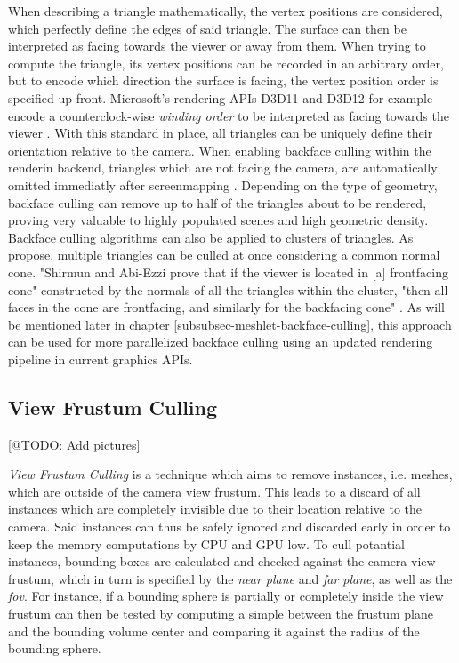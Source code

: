 \noindent
When describing a triangle mathematically, the vertex positions are considered, which perfectly define the edges of 
said triangle. The surface can then be interpreted as facing towards the viewer or away from them. 
When trying to compute the triangle, its vertex positions can be recorded in an arbitrary order, but to encode which 
direction the surface is facing, the vertex position order is specified up front. Microsoft's rendering \ac{API}s D3D11 
and D3D12 for example encode a counterclock-wise \emph{winding order} to be interpreted as facing towards the viewer 
\cite{D3DTopology2020}. With this standard in place, all triangles can be uniquely define their orientation relative 
to the camera. When enabling backface culling within the renderin backend, triangles which are not facing the camera, 
are automatically omitted immediatly after screenmapping \cite{AkenineMoeller2018}. Depending on the type of geometry, 
backface culling can remove up to half of the triangles about to be rendered, proving very valuable to highly populated 
scenes and high geometric density.\\

Backface culling algorithms can also be applied to clusters of triangles. As \cite{Shirmun1993} propose, multiple 
triangles can be culled at once considering a common normal cone. "Shirmun and Abi-Ezzi \cite{Shirmun1993} prove that 
if the viewer is located in [a] frontfacing cone" constructed by the normals of all the triangles within the cluster, 
"then all faces in the cone are frontfacing, and similarly for the backfacing cone" \cite{AkenineMoeller2018}. As 
will be mentioned later in chapter \ref{subsubsec-meshlet-backface-culling}, this approach can be used for more 
parallelized backface culling using an updated rendering pipeline in current graphics \ac{API}s.

\subsection{View Frustum Culling} \label{subsec-view-frustum-culling}

[@TODO: Add pictures]

\emph{View Frustum Culling} is a technique which aims to remove instances, i.e. meshes, which are outside of the camera 
view frustum. This leads to a discard of all instances which are completely invisible due to their location relative to 
the camera. Said instances can thus be safely ignored and discarded early in order to keep the memory computations by 
\ac{CPU} and \ac{GPU} low. To cull potantial instances, bounding boxes are calculated and checked against the camera 
view frustum, which in turn is specified by the \emph{near plane} and \emph{far plane}, as well as the \emph{fov}. For 
instance, if a bounding sphere is partially or completely inside the view frustum can then be tested by computing a 
simple  between the frustum plane and the bounding volume center and comparing it against the 
radius of the bounding sphere. \\

